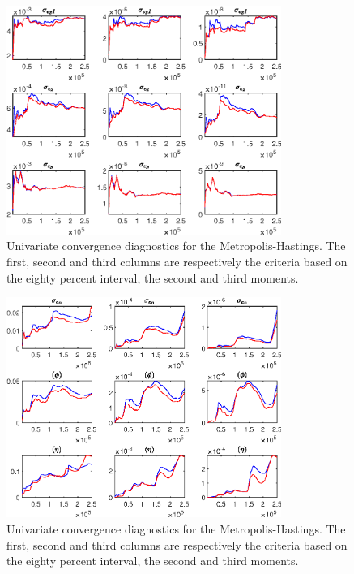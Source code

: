  
\begin{figure}[H]
\centering 
\includegraphics[width=0.80\textwidth]{BRS_comovement/Output/BRS_comovement_udiag1}
\caption{Univariate convergence diagnostics for the Metropolis-Hastings.
The first, second and third columns are respectively the criteria based on
the eighty percent interval, the second and third moments.}\label{Fig:UnivariateDiagnostics:1}
\end{figure}

\begin{figure}[H]
\centering 
\includegraphics[width=0.80\textwidth]{BRS_comovement/Output/BRS_comovement_udiag2}
\caption{Univariate convergence diagnostics for the Metropolis-Hastings.
The first, second and third columns are respectively the criteria based on
the eighty percent interval, the second and third moments.}\label{Fig:UnivariateDiagnostics:2}
\end{figure}

